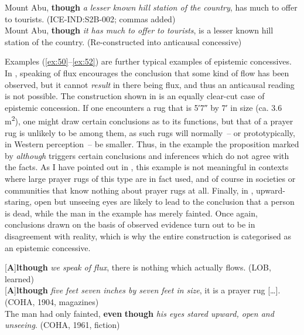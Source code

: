 \ea\label{ex:49}
    \ea\label{ex:49a}\label{bkm:Ref487278426}Mount Abu, \textbf{though} \textit{a lesser known hill station of the country}, has much to offer to tourists. (ICE-IND:S2B-002; commas added)\\
    \ex\label{ex:49b}Mount Abu, \textbf{though} \textit{it has much to offer to tourists}, is a lesser known hill station of the country. (Re-constructed into anticausal concessive)\\
\z
\z

Examples (\ref{ex:50}--\ref{ex:52}) are further typical examples of epistemic concessives. In , speaking of flux encourages the conclusion that some kind of flow has been observed, but it cannot \textit{result} in there being flux, and thus an anticausal reading is not possible. The construction shown in  is an equally clear-cut case of epistemic concession. If one encounters a rug that is 5′7″ by 7′ in size (ca. 3.6 m\textsuperscript{2}), one might draw certain conclusions as to its functions, but that of a prayer rug is unlikely to be among them, as such rugs will normally~– or prototypically, in Western perception~– be smaller. Thus, in the example the proposition marked by \textit{although} triggers certain conclusions and inferences which do not agree with the facts. As I have pointed out in \citet[203, footnote 4]{Schützler2018b}, this example is not meaningful in contexts where large prayer rugs of this type are in fact used, and of course in societies or communities that know nothing about prayer rugs at all. Finally, in , upward-staring, open but unseeing eyes are likely to lead to the conclusion that a person is dead, while the man in the example has merely fainted. Once again, conclusions drawn on the basis of observed evidence turn out to be in disagreement with reality, which is why the entire construction is categorised as an epistemic concessive.

\ea\label{ex:50}   \label{bkm:Ref487279094}[\textbf{A}]\textbf{lthough} \textit{we speak of flux}, there is nothing which actually flows. (LOB, learned)\\
    \ex\label{ex:51} \label{bkm:Ref487279077}[\textbf{A}]\textbf{lthough} \textit{five feet seven inches by seven feet in size}, it is a prayer rug […]. (COHA, 1904, magazines)\\
    \ex\label{ex:52} \label{bkm:Ref487279082}The man had only fainted, \textbf{even} \textbf{though} \textit{his eyes stared upward, open and unseeing}. (COHA, 1961, fiction)\\
\z

